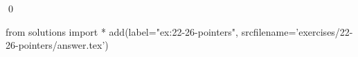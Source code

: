 
\begin{ex}
  \label{ex:22-26-pointers}
  
  \qed
\end{ex}
\begin{python0}
from solutions import *
add(label="ex:22-26-pointers",
    srcfilename='exercises/22-26-pointers/answer.tex')
\end{python0}
